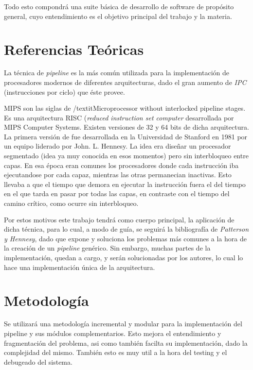 \documentclass[12pt]{article}
\begin{document}
Todo esto compondrá una suite básica de desarrollo de software de propósito general, cuyo entendimiento es el objetivo principal del trabajo y la materia.


\section{Referencias Teóricas} \label{sec:firstpage}

La técnica de \textit{pipeline} es la más común utilizada para la implementación de procesadores modernos de diferentes arquitecturas, dado el gran aumento de \textit{IPC} (instrucciones por ciclo) que éste provee.

MIPS son las siglas de /textit{Microprocessor without interlocked pipeline stages}. Es una arquitectura RISC (\textit{reduced instruction set computer} desarrollada por MIPS Computer Systems. Existen versiones de 32 y 64 bits de dicha arquitectura. La primera versión de fue desarrollada en la Universidad de Stanford en 1981 por un equipo liderado por John. L. Hennesy. La idea era diseñar un procesador segmentado (idea ya muy conocida en esos momentos) pero sin interbloqueo entre capas. En esa época eran comunes los procesadores donde cada instrucción iba ejecutandose por cada capaz, mientras las otras permanecian inactivas. Esto llevaba a que el tiempo que demora en ejecutar la instrucción fuera el del tiempo en el que tarda en pasar por todas las capas, en contraste con el tiempo del camino crítico, como ocurre sin interbloqueo. 

Por estos motivos este trabajo tendrá como cuerpo principal, la aplicación de dicha técnica, para lo cual, a modo de guía, se seguirá la bibliografía de \textit{Patterson y Hennesy}, dado que expone y soluciona los problemas más comunes a la hora de la creación de un \textit{pipeline} genérico. Sin embargo, muchas partes de la implementación, quedan a cargo, y serán solucionadas por los autores, lo cual lo hace una implementación única de la arquitectura.

\section{Metodología}

Se utilizará una metodología incremental y modular para la implementación del pipeline y sus módulos complementarios. Esto mejora el entendimiento y fragmentación del problema, asi como también facilta su implementación, dado la complejidad del mismo. También esto es muy util a la hora del testing y el debugeado del sistema.
\end{document}
